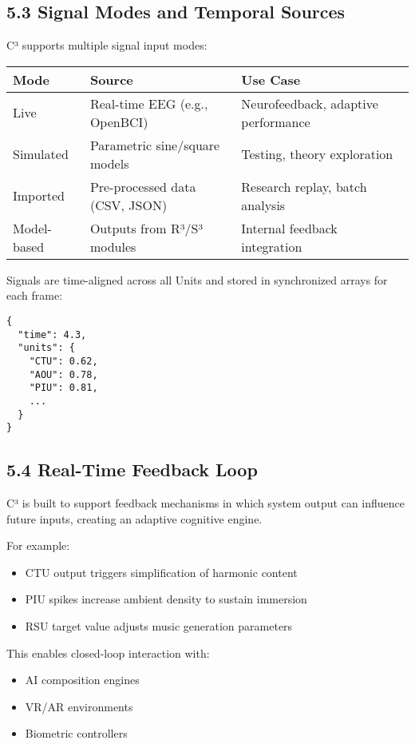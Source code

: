 \subsection*{5.3 Signal Modes and Temporal Sources}

C³ supports multiple signal input modes:

\begin{center}
\begin{tabular}{|l|l|p{6.5cm}|}
\hline
\textbf{Mode} & \textbf{Source} & \textbf{Use Case} \\
\hline
Live & Real-time EEG (e.g., OpenBCI) & Neurofeedback, adaptive performance \\
Simulated & Parametric sine/square models & Testing, theory exploration \\
Imported & Pre-processed data (CSV, JSON) & Research replay, batch analysis \\
Model-based & Outputs from R³/S³ modules & Internal feedback integration \\
\hline
\end{tabular}
\end{center}

Signals are time-aligned across all Units and stored in synchronized arrays for each frame:

\begin{verbatim}
{
  "time": 4.3,
  "units": {
    "CTU": 0.62,
    "AOU": 0.78,
    "PIU": 0.81,
    ...
  }
}
\end{verbatim}

\subsection*{5.4 Real-Time Feedback Loop}

C³ is built to support feedback mechanisms in which system output can influence future inputs, creating an adaptive cognitive engine.

For example:

\begin{itemize}
    \item CTU output triggers simplification of harmonic content
    \item PIU spikes increase ambient density to sustain immersion
    \item RSU target value adjusts music generation parameters
\end{itemize}

This enables closed-loop interaction with:

\begin{itemize}
    \item AI composition engines
    \item VR/AR environments
    \item Biometric controllers
\end{itemize}

